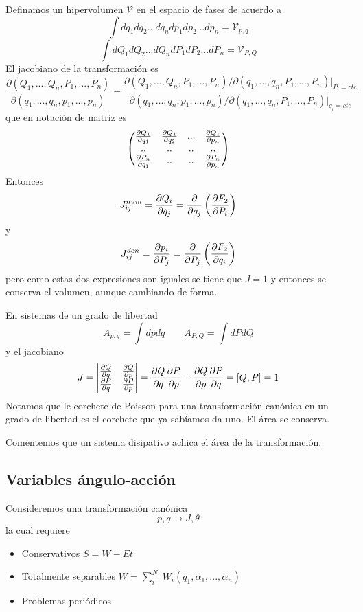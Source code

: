 \documentclass[10pt,oneside]{CBFT_book}
\begin{document}
Definamos un hipervolumen $\mathcal{V}$ en el espacio de fases de acuerdo a
\[
	\int dq_1 dq_2 ... dq_n dp_1 dp_2 ... dp_n = \mathcal{V}_{p,q}
\]
\[
	\int dQ_1 dQ_2 ... dQ_n dP_1 dP_2 ... dP_n = \mathcal{V}_{P,Q}
\]
El jacobiano de la transformación es 
\[
	\frac{\partial (Q_1,...,Q_n,P_1,...,P_n)}{\partial (q_1,...,q_n,p_1,...,p_n)} =
	\frac{\partial (Q_1,...,Q_n,P_1,...,P_n)/\partial (q_1,...,q_n,P_1,...,P_n)|_{P_i=cte}}
	{\partial (q_1,...,q_n,p_1,...,p_n)/\partial (q_1,...,q_n,P_1,...,P_n)|_{q_i=cte}}
\]
que en notación de matriz es 
\[
	\begin{pmatrix}
	\dpar{Q_1}{q_1} & \dpar{Q_1}{q_2} & ... & \dpar{Q_1}{p_n} \\
	.. & .. & .. & .. \\
	\dpar{P_n}{q_1} & .. & .. & \dpar{P_n}{p_n}
	\end{pmatrix}
\]
Entonces 
\[
	J_{ij}^{num} = \dpar{Q_i}{q_j} = \frac{\partial}{\partial q_j} \left(\dpar{F_2}{P_i} \right)
\]
y
\[
	J_{ij}^{den} = \dpar{p_i}{P_j} = \frac{\partial}{\partial P_j} \left(\dpar{F_2}{q_i} \right)
\]
pero como estas dos expresiones son iguales se tiene que $J=1$ y entonces se conserva
el volumen, aunque cambiando de forma.

En sistemas de un grado de libertad
\[
	A_{p,q} = \int dp dq \qquad A_{P,Q} = \int dP dQ
\]
y el jacobiano
\[
	J = \begin{vmatrix}
	     \dpar{Q}{q} & \dpar{Q}{p} \\
	     \dpar{P}{q} & \dpar{P}{p}
	    \end{vmatrix} =
	    \dpar{Q}{q} \dpar{P}{p} - \dpar{Q}{p} \dpar{P}{q} = [Q, P] = 1
\]
Notamos que le corchete de Poisson para una transformación canónica en un grado de
libertad es el corchete que ya sabíamos da uno. El área se conserva.

Comentemos que un sistema disipativo achica el área de la transformación.

\subsection{Variables ángulo-acción}

Consideremos una transformación canónica 
\[
	p,q \longrightarrow J,\theta
\]
la cual requiere
\begin{itemize}
 \item Conservativos $S = W - Et $
 \item Totalmente separables $W = \sum_i^N \; W_i(q_1,\alpha_1,...,\alpha_n)$
 \item Problemas periódicos
\end{itemize}
\end{document}
